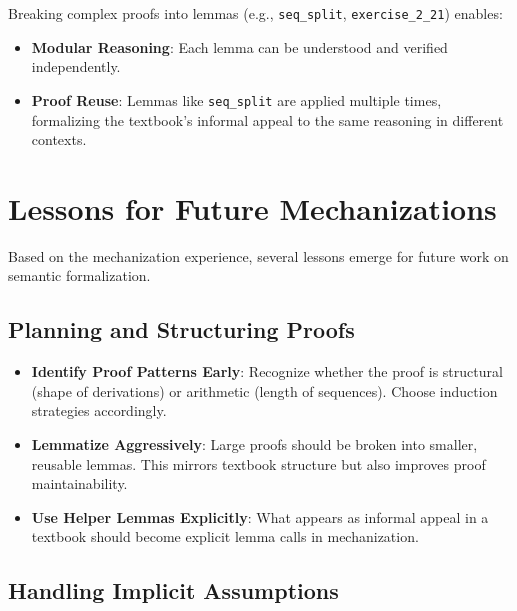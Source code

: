 Breaking complex proofs into lemmas (e.g., \texttt{seq\_split},
\texttt{exercise\_2\_21}) enables:

\begin{itemize}
    \item \textbf{Modular Reasoning}:
    Each lemma can be understood and verified independently.
    
    \item \textbf{Proof Reuse}:
    Lemmas like \texttt{seq\_split} are applied multiple times,
    formalizing the textbook's informal appeal to the same reasoning in
    different contexts.
\end{itemize}


%
%
%
\section{Lessons for Future Mechanizations}
\label{discussion:sec:lessons}

Based on the mechanization experience,
several lessons emerge for future work on semantic formalization.

\subsection*{Planning and Structuring Proofs}

\begin{itemize}
    \item \textbf{Identify Proof Patterns Early}:
    Recognize whether the proof is structural (shape of derivations)
    or arithmetic (length of sequences).
    Choose induction strategies accordingly.
    
    \item \textbf{Lemmatize Aggressively}:
    Large proofs should be broken into smaller,
    reusable lemmas. This mirrors textbook structure but also improves
    proof maintainability.
    
    \item \textbf{Use Helper Lemmas Explicitly}:
    What appears as informal appeal in a textbook should
    become explicit lemma calls in mechanization.
\end{itemize}

\subsection*{Handling Implicit Assumptions}

